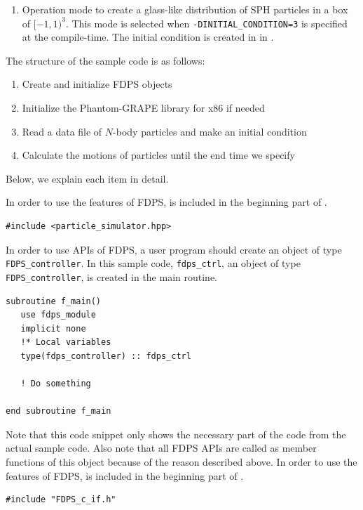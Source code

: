 \begin{enumerate}[leftmargin=*,itemsep=-1ex,label=(\alph*)]
\item Operation mode to create a glass-like distribution of SPH particles in a box of $[-1,1)^{3}$. This mode is selected when \texttt{-DINITIAL\_CONDITION=3} is specified at the compile-time. The initial condition is created in \procedure {} in .
\end{enumerate}


The structure of the sample code is as follows:
\begin{enumerate}[leftmargin=*,itemsep=-1ex,label=(\arabic*)]
\item Create and initialize FDPS objects
\item Initialize the Phantom-GRAPE library for x86 if needed
\item Read a data file of $N$-body particles and make an initial condition
\item Calculate the motions of particles until the end time we specify
\end{enumerate}

Below, we explain each item in detail.

\ifCpp %
In order to use the features of FDPS,  is included in the beginning part of .
\begin{lstlisting}[caption=Include the header file of FDPS]
#include <particle_simulator.hpp>
\end{lstlisting}
\endifCpp
\ifFtn %
In order to use APIs of FDPS, a user program should create an object of type \texttt{FDPS\_controller}.
In this sample code, \texttt{fdps\_ctrl}, an object of type \texttt{FDPS\_controller}, is created in the main routine.
\begin{lstlisting}[caption=Creation of an object of type \texttt{fdps\_controller}]
subroutine f_main()
   use fdps_module
   implicit none
   !* Local variables
   type(fdps_controller) :: fdps_ctrl
    
   ! Do something
   
end subroutine f_main    
\end{lstlisting}
Note that this code snippet only shows the necessary part of the code from the actual sample code. Also note that all FDPS APIs are called as member functions of this object because of the reason described above.
\endifFtn
\ifC %
In order to use the features of FDPS,  is included in the beginning part of .
\begin{lstlisting}[caption=Include the header file of FDPS C interface]
#include "FDPS_c_if.h"
\end{lstlisting}
\endifC

